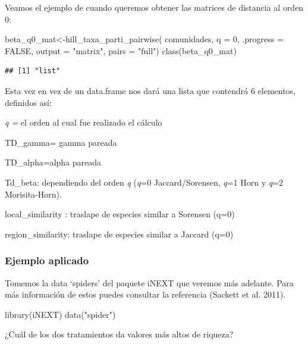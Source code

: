 \documentclass[
]{article}
\newenvironment{Shaded}{\begin{snugshade}}{\end{snugshade}}
\newcommand{\AttributeTok}[1]{\textcolor[rgb]{0.77,0.63,0.00}{#1}}
\newcommand{\ConstantTok}[1]{\textcolor[rgb]{0.00,0.00,0.00}{#1}}
\newcommand{\DecValTok}[1]{\textcolor[rgb]{0.00,0.00,0.81}{#1}}
\newcommand{\FunctionTok}[1]{\textcolor[rgb]{0.00,0.00,0.00}{#1}}
\newcommand{\NormalTok}[1]{#1}
\newcommand{\OtherTok}[1]{\textcolor[rgb]{0.56,0.35,0.01}{#1}}
\newcommand{\StringTok}[1]{\textcolor[rgb]{0.31,0.60,0.02}{#1}}
\begin{document}
Veamos el ejemplo de cuando queremos obtener las matrices de distancia
al orden 0:

\begin{Shaded}
\begin{Highlighting}[]
\NormalTok{beta\_q0\_mat}\OtherTok{\textless{}{-}}\FunctionTok{hill\_taxa\_parti\_pairwise}\NormalTok{(}
\NormalTok{  comunidades, }\AttributeTok{q =} \DecValTok{0}\NormalTok{, }\AttributeTok{.progress =} \ConstantTok{FALSE}\NormalTok{,}
  \AttributeTok{output =} \StringTok{"matrix"}\NormalTok{, }\AttributeTok{pairs =} \StringTok{"full"}\NormalTok{)}
\FunctionTok{class}\NormalTok{(beta\_q0\_mat)}
\end{Highlighting}
\end{Shaded}

\begin{verbatim}
## [1] "list"
\end{verbatim}

Esta vez en vez de un data.frame nos dará una lista que contendrá 6
elementos, definidos así:

\emph{q =} el orden al cual fue realizado el cálculo

TD\_gamma= gamma pareada

TD\_alpha=alpha pareada

Td\_beta: dependiendo del orden \emph{q} (\emph{q}=0 Jaccard/Sorensen,
\emph{q}=1 Horn y \emph{q}=2 Morisita-Horn).

local\_similarity : traslape de especies similar a Sorensen (q=0)

region\_similarity: traslape de especies similar a Jaccard (q=0)

\hypertarget{ejemplo-aplicado}{%
\subsubsection{Ejemplo aplicado}\label{ejemplo-aplicado}}

Tomemos la data `spiders' del paquete iNEXT que veremos más adelante.
Para más información de estos puedes consultar la referencia (Sackett et
al. 2011).

\begin{Shaded}
\begin{Highlighting}[]
\FunctionTok{library}\NormalTok{(iNEXT)}
\FunctionTok{data}\NormalTok{(}\StringTok{"spider"}\NormalTok{)}
\end{Highlighting}
\end{Shaded}

¿Cuál de los dos tratamientos da valores más altos de riqueza?
\end{document}
